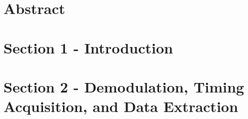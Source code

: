 \documentclass[10pt,a4paper]{report}
\begin{document}
	
	


\gdef \title{Software Radio Fall 2023 Final Project Submission } %
\gdef \author{Grant Brown}	 %
\gdef \dept{Electronics and Communication Engineering} %
\gdef \college{College of Engineering University of Utah} %
\gdef \collegeplace{Salt Lake City, UT} %
\gdef \studentA{Grant Brown} %

\gdef \acadyear{2022 - 23} %
\gdef \month{December 2023} %
\gdef \date{15-12-2023} %





\cleardoublepage
\setcounter{page}{1}

\section{Abstract}

\vspace{-1.5em}
\section{Section 1 - Introduction}

\vspace{-1em}
\section{Section 2 - Demodulation, Timing Acquisition, and Data Extraction}

\vspace{-1em}
\end{document}
